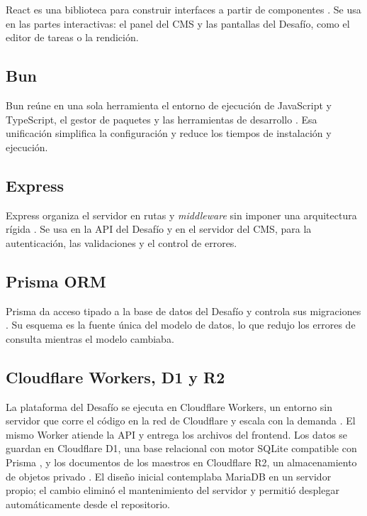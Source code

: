 React es una biblioteca para construir interfaces a partir de componentes \parencite{react}. Se usa en las partes interactivas: el panel del CMS y las pantallas del Desafío, como el editor de tareas o la rendición.

\subsection{Bun}

Bun reúne en una sola herramienta el entorno de ejecución de JavaScript y TypeScript, el gestor de paquetes y las herramientas de desarrollo \parencite{bun}. Esa unificación simplifica la configuración y reduce los tiempos de instalación y ejecución.

\subsection{Express}

Express organiza el servidor en rutas y \textit{middleware} sin imponer una arquitectura rígida \parencite{express}. Se usa en la API del Desafío y en el servidor del CMS, para la autenticación, las validaciones y el control de errores.

\subsection{Prisma ORM}

Prisma da acceso tipado a la base de datos del Desafío y controla sus migraciones \parencite{prisma}. Su esquema es la fuente única del modelo de datos, lo que redujo los errores de consulta mientras el modelo cambiaba.

\subsection{Cloudflare Workers, D1 y R2}

La plataforma del Desafío se ejecuta en Cloudflare Workers, un entorno sin servidor que corre el código en la red de Cloudflare y escala con la demanda \parencite{cfworkers}. El mismo Worker atiende la API y entrega los archivos del frontend. Los datos se guardan en Cloudflare D1, una base relacional con motor SQLite compatible con Prisma \parencite{cfd1}, y los documentos de los maestros en Cloudflare R2, un almacenamiento de objetos privado \parencite{cfr2}. El diseño inicial contemplaba MariaDB en un servidor propio; el cambio eliminó el mantenimiento del servidor y permitió desplegar automáticamente desde el repositorio.

